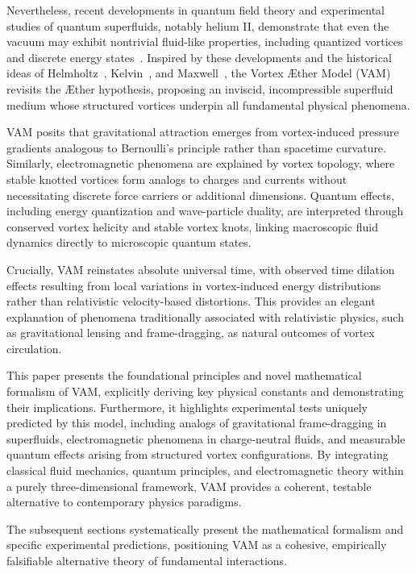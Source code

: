 \documentclass[aps,preprint,superscriptaddress]{revtex4-2}
\begin{document}
    Nevertheless, recent developments in quantum field theory and experimental studies of quantum superfluids, notably helium II, demonstrate that even the vacuum may exhibit nontrivial fluid-like properties, including quantized vortices and discrete energy states~\cite{Wilczek1999,Donnelly1991quantized}. Inspired by these developments and the historical ideas of Helmholtz~\cite{helmholtz1867integrals}, Kelvin~\cite{kelvin1867vortex}, and Maxwell~\cite{maxwell1865dynamical}, the Vortex Æther Model (VAM) revisits the Æther hypothesis, proposing an inviscid, incompressible superfluid medium whose structured vortices underpin all fundamental physical phenomena.

    VAM posits that gravitational attraction emerges from vortex-induced pressure gradients analogous to Bernoulli’s principle rather than spacetime curvature. Similarly, electromagnetic phenomena are explained by vortex topology, where stable knotted vortices form analogs to charges and currents without necessitating discrete force carriers or additional dimensions. Quantum effects, including energy quantization and wave-particle duality, are interpreted through conserved vortex helicity and stable vortex knots, linking macroscopic fluid dynamics directly to microscopic quantum states.

    Crucially, VAM reinstates absolute universal time, with observed time dilation effects resulting from local variations in vortex-induced energy distributions rather than relativistic velocity-based distortions. This provides an elegant explanation of phenomena traditionally associated with relativistic physics, such as gravitational lensing and frame-dragging, as natural outcomes of vortex circulation.

    This paper presents the foundational principles and novel mathematical formalism of VAM, explicitly deriving key physical constants and demonstrating their implications. Furthermore, it highlights experimental tests uniquely predicted by this model, including analogs of gravitational frame-dragging in superfluids, electromagnetic phenomena in charge-neutral fluids, and measurable quantum effects arising from structured vortex configurations. By integrating classical fluid mechanics, quantum principles, and electromagnetic theory within a purely three-dimensional framework, VAM provides a coherent, testable alternative to contemporary physics paradigms.

    The subsequent sections systematically present the mathematical formalism and specific experimental predictions, positioning VAM as a cohesive, empirically falsifiable alternative theory of fundamental interactions.
\end{document}
